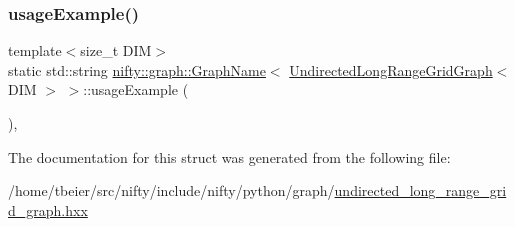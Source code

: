 \subsubsection{\texorpdfstring{usage\+Example()}{usageExample()}}
{\footnotesize\ttfamily template$<$size\+\_\+t D\+IM$>$ \\
static std\+::string \hyperlink{structnifty_1_1graph_1_1GraphName}{nifty\+::graph\+::\+Graph\+Name}$<$ \hyperlink{classnifty_1_1graph_1_1UndirectedLongRangeGridGraph}{Undirected\+Long\+Range\+Grid\+Graph}$<$ D\+IM $>$ $>$\+::usage\+Example (\begin{DoxyParamCaption}{ }\end{DoxyParamCaption})\hspace{0.3cm}{\ttfamily [inline]}, {\ttfamily [static]}}



The documentation for this struct was generated from the following file\+:\begin{DoxyCompactItemize}
\item 
/home/tbeier/src/nifty/include/nifty/python/graph/\hyperlink{python_2graph_2undirected__long__range__grid__graph_8hxx}{undirected\+\_\+long\+\_\+range\+\_\+grid\+\_\+graph.\+hxx}\end{DoxyCompactItemize}
